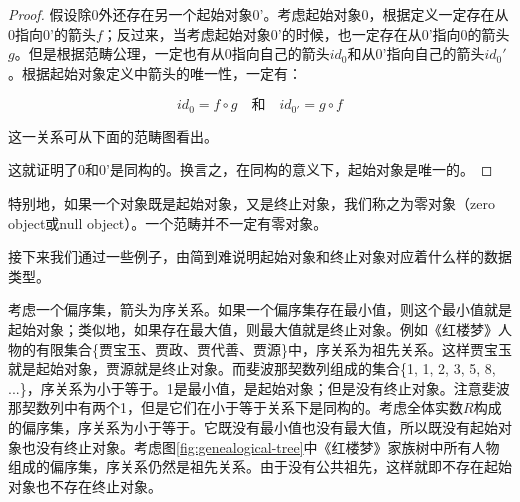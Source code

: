 \documentclass{article}
\begin{document}
\begin{proof}
假设除0外还存在另一个起始对象0'。考虑起始对象0，根据定义一定存在从0指向0'的箭头$f$；反过来，当考虑起始对象0'的时候，也一定存在从0'指向0的箭头$g$。但是根据范畴公理，一定也有从0指向自己的箭头$id_0$和从0'指向自己的箭头$id_0'$。根据起始对象定义中箭头的唯一性，一定有：

\[
  id_0 = f \circ g \quad \text{和} \quad id_{0'} = g \circ f
\]

这一关系可从下面的范畴图看出。

\begin{center}
\end{center}

这就证明了0和0'是同构的。换言之，在同构的意义下，起始对象是唯一的。
\end{proof}

特别地，如果一个对象既是起始对象，又是终止对象，我们称之为零对象（zero object或null object）。一个范畴并不一定有零对象。

接下来我们通过一些例子，由简到难说明起始对象和终止对象对应着什么样的数据类型。

\begin{example}
考虑一个偏序集，箭头为序关系。如果一个偏序集存在最小值，则这个最小值就是起始对象；类似地，如果存在最大值，则最大值就是终止对象。例如《红楼梦》人物的有限集合\{贾宝玉、贾政、贾代善、贾源\}中，序关系为祖先关系。这样贾宝玉就是起始对象，贾源就是终止对象。而斐波那契数列组成的集合\{1, 1, 2, 3, 5, 8, ...\}，序关系为小于等于。1是最小值，是起始对象；但是没有终止对象。注意斐波那契数列中有两个1，但是它们在小于等于关系下是同构的。考虑全体实数$R$构成的偏序集，序关系为小于等于。它既没有最小值也没有最大值，所以既没有起始对象也没有终止对象。考虑图\ref{fig:genealogical-tree}中《红楼梦》家族树中所有人物组成的偏序集，序关系仍然是祖先关系。由于没有公共祖先，这样就即不存在起始对象也不存在终止对象。
\end{example}
\end{document}
